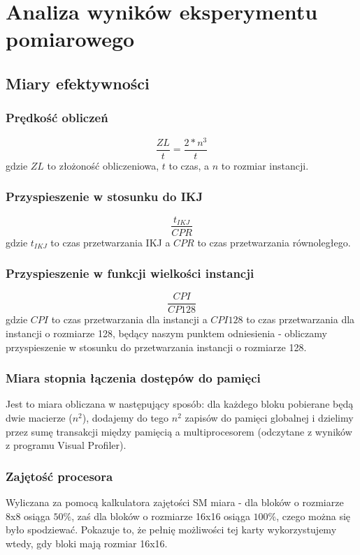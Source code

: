\documentclass[10pt,a4paper]{article}
\begin{document}
\section{Analiza wyników eksperymentu pomiarowego}
\subsection{Miary efektywności}
\subsubsection*{Prędkość obliczeń}
\begin{equation}
	\frac{ZL}{t} = \frac{2 * n^3}{t}
\end{equation}
gdzie $ZL$ to złożoność obliczeniowa, $t$ to czas, a $n$ to rozmiar instancji.

\subsubsection*{Przyspieszenie w stosunku do IKJ}
\begin{equation}
	\frac{t_{IKJ}}{CPR}
\end{equation}
gdzie $t_{IKJ}$ to czas przetwarzania IKJ a $CPR$ to czas przetwarzania równoległego.

\subsubsection*{Przyspieszenie w funkcji wielkości instancji}
\begin{equation}
	\frac{CPI}{CP 128}
\end{equation}
gdzie $CPI$ to czas przetwarzania dla instancji a $CPI 128$ to czas przetwarzania dla
instancji o rozmiarze 128, będący naszym punktem odniesienia - obliczamy przyspieszenie
w stosunku do przetwarzania instancji o rozmiarze 128.

\subsubsection*{Miara stopnia łączenia dostępów do pamięci}
Jest to miara obliczana w następujący sposób: dla każdego bloku pobierane
będą dwie macierze ($n^2$), dodajemy do tego $n^2$ zapisów do pamięci globalnej
i dzielimy przez sumę transakcji między pamięcią a multiprocesorem (odczytane
z wyników z programu Visual Profiler).\\

\subsubsection*{Zajętość procesora}
Wyliczana za pomocą kalkulatora zajętości SM miara - dla bloków o rozmiarze
8x8 osiąga $50\%$, zaś dla bloków o rozmiarze 16x16 osiąga $100\%$, czego można
się było spodziewać. Pokazuje to, że pełnię możliwości tej karty wykorzystujemy
wtedy, gdy bloki mają rozmiar 16x16.
\end{document}
